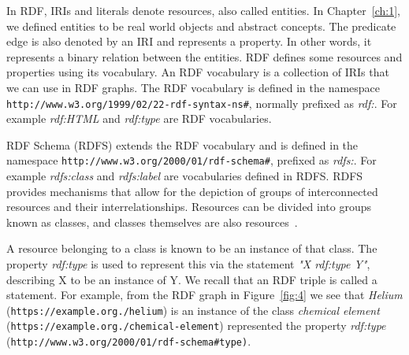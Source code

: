 In RDF, IRIs and literals denote resources, also called entities. In Chapter~\ref{ch:1}, we defined entities to be real world objects and abstract concepts. The predicate edge is also denoted by an IRI and represents a property. In other words, it represents a binary relation between the entities. RDF defines some resources and properties using its vocabulary. An RDF vocabulary is a collection of IRIs that we can use in RDF graphs. The RDF vocabulary is defined in the namespace \texttt{http://www.w3.org/1999/02/22-rdf-syntax-ns\#}, normally prefixed as \textit{rdf:}. For example \textit{rdf:HTML} and \textit{rdf:type} are RDF vocabularies.

RDF Schema (RDFS) extends the RDF vocabulary and is defined in the namespace \texttt{http://www.w3.org/2000/01/rdf-schema\#}, prefixed as \textit{rdfs:}. For example \textit{rdfs:class} and \textit{rdfs:label} are vocabularies defined in RDFS. RDFS provides mechanisms that allow for the depiction of groups of interconnected resources and their interrelationships. Resources can be divided into groups known as classes, and classes themselves are also resources~\cite{Brickley2014}. 

A resource belonging to a class is known to be an instance of that class. The property \textit{rdf:type} is used to represent this via the statement \textit{"X rdf:type Y"}, describing X to be an instance of Y. We recall that an RDF triple is called a statement. For example, from the RDF graph in Figure~\ref{fig:4} we see that \textit{Helium} (\texttt{https://example.org./helium}) is an instance of the class \textit{chemical element} (\texttt{https://example.org./chemical-element}) represented the property \textit{rdf:type} (\texttt{http://www.w3.org/2000/01/rdf-schema\#type)}. 


